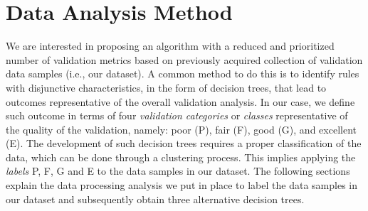 
\section{Data Analysis Method}
\label{sec:method}

We are interested in proposing an algorithm with a reduced and prioritized number of validation metrics based on previously acquired collection of validation data samples (i.e., our dataset). A common method to do this is to identify rules with disjunctive characteristics, in the form of decision trees, that lead to outcomes representative of the overall validation analysis. In our case, we define such outcome in terms of four \textit{validation categories} or \textit{classes} representative of the quality of the validation, namely: poor (P), fair (F), good (G), and excellent (E). The development of such decision trees requires a proper classification of the data, which can be done through a clustering process. This implies applying the \textit{labels} P, F, G and E to the data samples in our dataset. The following sections explain the data processing analysis we put in place to label the data samples in our dataset and subsequently obtain three alternative decision trees.





